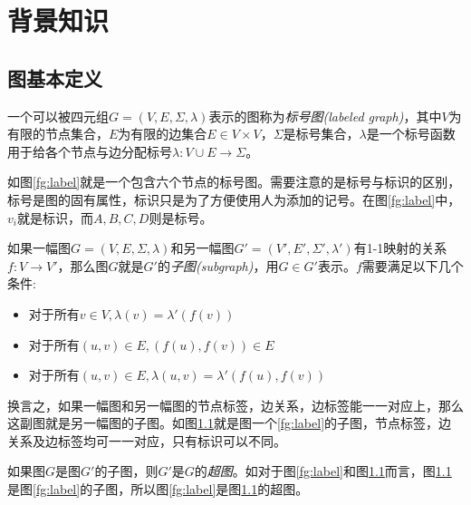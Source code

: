 \documentclass{XDBAthesis}
\begin{document}
\else
\fi
\chapter{背景知识}
\label{chap:background}
\section{图基本定义}
\begin{defn}[标号图]\cite{ghash}
    一个可以被四元组$G=(V,E,\Sigma,\lambda)$表示的图称为\emph{标号图(labeled graph)}，其中$V$为有限的节点集合，$E$为有限的边集合$E\in V\times V$，$\Sigma$是标号集合，$\lambda$是一个标号函数用于给各个节点与边分配标号$\lambda :V\cup E\rightarrow\Sigma$。
\end{defn}
如图\ref{fg:label}就是一个包含六个节点的标号图。需要注意的是标号与标识的区别，标号是图的固有属性，标识只是为了方便使用人为添加的记号。在图\ref{fg:label}中，$v_i $就是标识，而$A,B,C,D$则是标号。

\begin{figure}[htp]
    \begin{minipage}{0.5\textwidth}
        \centering
        
        \label{fg:label}
    \end{minipage}%
    \begin{minipage}{0.5\textwidth}
        \centering
        
        \label{fg:sub}
    \end{minipage}\hfill
\end{figure}
\begin{defn}[子图]
    如果一幅图$G=(V,E,\Sigma,\lambda)$和另一幅图$G'=(V',E',\Sigma',\lambda')$有1-1映射的关系$f:V\rightarrow V'$，那么图$G$就是$G'$的\emph{子图(subgraph)}，用$G\in G' $表示。$f$需要满足以下几个条件:
\begin{itemize}
    \item 对于所有$v\in V,\lambda(v)=\lambda '(f(v))$
    \item 对于所有$(u,v)\in E,(f(u),f(v))\in E$
    \item 对于所有$(u,v)\in E,\lambda(u,v)=\lambda '(f(u),f(v)) $
\end{itemize}
\end{defn}
换言之，如果一幅图和另一幅图的节点标签，边关系，边标签能一一对应上，那么这副图就是另一幅图的子图。如图\ref{fg:sub}就是图一个\ref{fg:label}的子图，节点标签，边关系及边标签均可一一对应，只有标识可以不同。
\begin{defn}[超图]
    如果图$G$是图$G'$的子图，则$G'$是$G$的\emph{超图}。如对于图\ref{fg:label}和图\ref{fg:sub}而言，图\ref{fg:sub}是图\ref{fg:label}的子图，所以图\ref{fg:label}是图\ref{fg:sub}的超图。
\end{defn}
\end{document}
